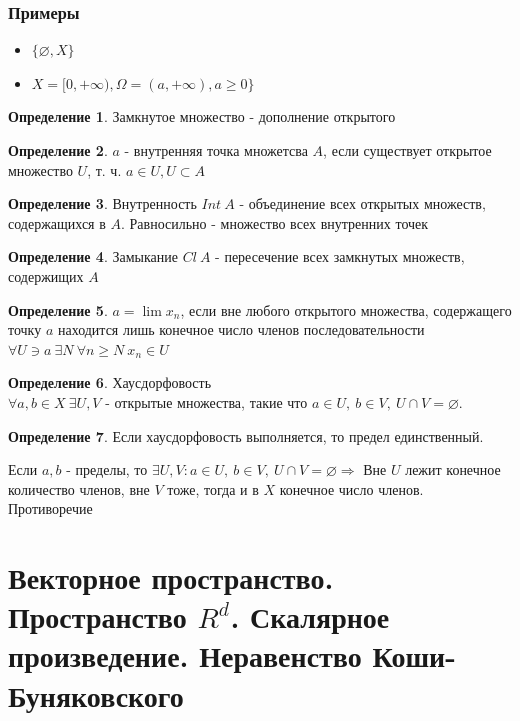 \documentclass[12pt,letterpaper]{report}
\makeatletter
\theoremstyle{definition}
\newtheorem*{conj}{Определение}
\renewenvironment{proof}[1][\proofname]{%
   \par\pushQED{\qed}\normalfont%
   \topsep6\p@\@plus6\p@\relax
   \trivlist\item[\hskip\labelsep\bfseries#1\@addpunct{.}]%
   \ignorespaces
}{%
   \popQED\endtrivlist\@endpefalse
}
\makeatother
\begin{document}
    \subsubsection*{Примеры}
    \begin{itemize}
        \item[] $\{\varnothing, X\}$
        \item[] $X = [0, +\infty), \Omega = (a, +\infty), a\geq 0\}$
    \end{itemize}  

    \begin{conj}
        Замкнутое множество - дополнение открытого
    \end{conj}
    \begin{conj}
        $a$ - внутренняя точка множетсва $A$, если существует открытое множество $U$, т. ч. $a \in U, U\subset A$
    \end{conj}
    \begin{conj}
        Внутренность $Int\ A$ - объединение всех открытых множеств, содержащихся в $A$. Равносильно - множество всех внутренних точек
    \end{conj}
    \begin{conj}
        Замыкание $Cl\ A$ - пересечение всех замкнутых множеств, содержищих $A$
    \end{conj}
    \begin{conj}
        $a = \lim x_n$, если вне любого открытого множества, содержащего точку $a$ находится лишь конечное число членов последовательности \\
        $\forall U \ni a\ \exists N\ \forall n\geq N\ x_n \in U$
    \end{conj}
    \begin{conj}
        Хаусдорфовость \\
        $\forall a, b \in X \ \exists U, V$ - открытые множества, такие что $a\in U,\ b\in V,\ U\cap V = \varnothing$.
    \end{conj}
    \begin{conj} 
        Если хаусдорфовость выполняется, то предел единственный.
        \begin{proof}
            Если $a, b$ - пределы, то $\exists U, V : a\in U,\ b\in V,\ U\cap V = \varnothing \Longrightarrow $ Вне $U$ лежит конечное количество членов, вне $V$ тоже, тогда и в $X$ конечное число членов. Противоречие
        \end{proof}
    \end{conj}

    \section{Векторное пространство. Пространство $R^d$. Скалярное произведение. Неравенство Коши-Буняковского}
    
\end{document}
